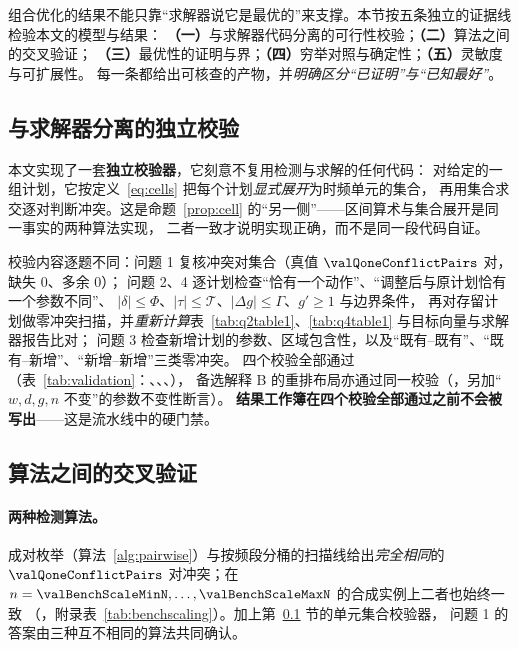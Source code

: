 组合优化的结果不能只靠“求解器说它是最优的”来支撑。本节按五条独立的证据线检验本文的模型与结果：
\textbf{（一）}与求解器代码分离的可行性校验；\textbf{（二）}算法之间的交叉验证；
\textbf{（三）}最优性的证明与界；\textbf{（四）}穷举对照与确定性；\textbf{（五）}灵敏度与可扩展性。
每一条都给出可核查的产物，并\emph{明确区分“已证明”与“已知最好”}。

\subsection{与求解器分离的独立校验}
\label{sec:indepcheck}

本文实现了一套\textbf{独立校验器}，它刻意不复用检测与求解的任何代码：
对给定的一组计划，它按定义~\eqref{eq:cells} 把每个计划\emph{显式展开}为时频单元的集合，
再用集合求交逐对判断冲突。这是命题~\ref{prop:cell} 的“另一侧”——区间算术与集合展开是同一事实的两种算法实现，
二者一致才说明实现正确，而不是同一段代码自证。

\begin{table}[htbp]
\centering\small
\caption{四个问题的独立校验结论。校验器与检测/求解代码分离，按定义展开时频单元集合并用集合求交复核。}
\label{tab:validation}
\setlength{\tabcolsep}{4pt}
\resizebox{\linewidth}{!}{}
\end{table}

校验内容逐题不同：问题 1 复核冲突对集合（真值 $\valQoneConflictPairs$ 对，缺失 $0$、多余 $0$）；
问题 2、4 逐计划检查“恰有一个动作”、“调整后与原计划恰有一个参数不同”、
$|\delta|\le\Phi$、$|\tau|\le\mathcal{T}$、$|\Delta g|\le\Gamma$、$g'\ge 1$ 与边界条件，
再对存留计划做零冲突扫描，并\emph{重新计算}表~\ref{tab:q2table1}、\ref{tab:q4table1} 与目标向量与求解器报告比对；
问题 3 检查新增计划的参数、区域包含性，以及“既有--既有”、“既有--新增”、“新增--新增”三类零冲突。
四个校验全部通过（表~\ref{tab:validation}：\valQoneValidator{}、\valQtwoValidator{}、\valQthreeValidator{}、\valQfourValidator{}），
备选解释 B 的重排布局亦通过同一校验（\valQthreeAltRepackValidator{}，另加“$w,d,g,n$ 不变”的参数不变性断言）。
\textbf{结果工作簿在四个校验全部通过之前不会被写出}——这是流水线中的硬门禁。

\subsection{算法之间的交叉验证}

\paragraph{两种检测算法。}成对枚举（算法~\ref{alg:pairwise}）与按频段分桶的扫描线给出\emph{完全相同}的
$\valQoneConflictPairs$ 对冲突；在 $n=\valBenchScaleMinN,\dots,\valBenchScaleMaxN$ 的合成实例上二者也始终一致
（\valBenchScaleDetectorsAgree{}，附录表~\ref{tab:benchscaling}）。加上第~\ref{sec:indepcheck} 节的单元集合校验器，
问题 1 的答案由三种互不相同的算法共同确认。


